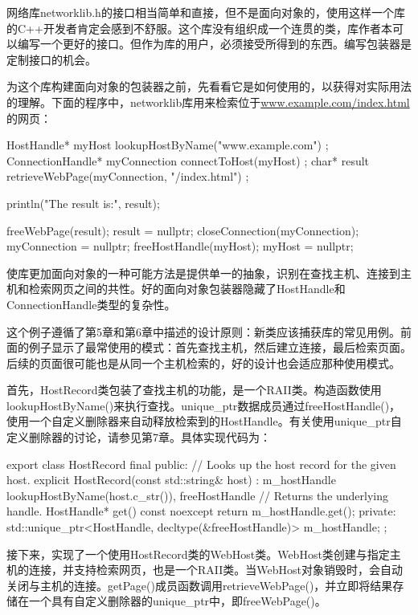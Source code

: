 网络库networklib.h的接口相当简单和直接，但不是面向对象的，使用这样一个库的C++开发者肯定会感到不舒服。这个库没有组织成一个连贯的类，库作者本可以编写一个更好的接口。但作为库的用户，必须接受所得到的东西。编写包装器是定制接口的机会。

为这个库构建面向对象的包装器之前，先看看它是如何使用的，以获得对实际用法的理解。下面的程序中，networklib库用来检索位于\url{www.example.com/index.html}的网页：

\begin{cpp}
HostHandle* myHost { lookupHostByName("www.example.com") };
ConnectionHandle* myConnection { connectToHost(myHost) };
char* result { retrieveWebPage(myConnection, "/index.html") };

println("The result is:\n{}", result);

freeWebPage(result); result = nullptr;
closeConnection(myConnection); myConnection = nullptr;
freeHostHandle(myHost); myHost = nullptr;
\end{cpp}

使库更加面向对象的一种可能方法是提供单一的抽象，识别在查找主机、连接到主机和检索网页之间的共性。好的面向对象包装器隐藏了HostHandle和ConnectionHandle类型的复杂性。

这个例子遵循了第5章和第6章中描述的设计原则：新类应该捕获库的常见用例。前面的例子显示了最常使用的模式：首先查找主机，然后建立连接，最后检索页面。后续的页面很可能也是从同一个主机检索的，好的设计也会适应那种使用模式。

首先，HostRecord类包装了查找主机的功能，是一个RAII类。构造函数使用lookupHostByName()来执行查找。unique\_ptr数据成员通过freeHostHandle()，使用一个自定义删除器来自动释放检索到的HostHandle。有关使用unique\_ptr自定义删除器的讨论，请参见第7章。具体实现代码为：

\begin{cpp}
export class HostRecord final
{
    public:
        // Looks up the host record for the given host.
        explicit HostRecord(const std::string& host)
            : m_hostHandle { lookupHostByName(host.c_str()), freeHostHandle }
        { }
        // Returns the underlying handle.
        HostHandle* get() const noexcept { return m_hostHandle.get(); }
    private:
        std::unique_ptr<HostHandle, decltype(&freeHostHandle)> m_hostHandle;
};
\end{cpp}

接下来，实现了一个使用HostRecord类的WebHost类。WebHost类创建与指定主机的连接，并支持检索网页，也是一个RAII类。当WebHost对象销毁时，会自动关闭与主机的连接。getPage()成员函数调用retrieveWebPage()，并立即将结果存储在一个具有自定义删除器的unique\_ptr中，即freeWebPage()。

